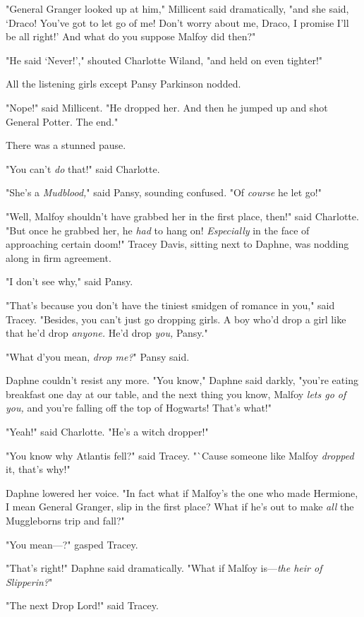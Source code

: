 "General Granger looked up at him," Millicent said dramatically, "and she said,
`Draco! You've got to let go of me! Don't worry about me, Draco, I promise I'll
be all right!' And what do you suppose Malfoy did then?"

"He said `Never!'," shouted Charlotte Wiland, "and held on even tighter!"

All the listening girls except Pansy Parkinson nodded.

"Nope!" said Millicent. "He dropped her. And then he jumped up and shot General
Potter. The end."

There was a stunned pause.

"You can't \emph{do} that!" said Charlotte.

"She's a \emph{Mudblood,}" said Pansy, sounding confused. "Of \emph{course} he
let go!"

"Well, Malfoy shouldn't have grabbed her in the first place, then!" said
Charlotte. "But once he grabbed her, he \emph{had} to hang on!
\emph{Especially} in the face of approaching certain doom!" Tracey Davis,
sitting next to Daphne, was nodding along in firm agreement.

"I don't see why," said Pansy.

"That's because you don't have the tiniest smidgen of romance in you," said
Tracey. "Besides, you can't just go dropping girls. A boy who'd drop a girl
like that{\el} he'd drop \emph{anyone.} He'd drop \emph{you,} Pansy."

"What d'you mean, \emph{drop me?}" Pansy said.

Daphne couldn't resist any more. "You know," Daphne said darkly, "you're eating
breakfast one day at our table, and the next thing you know, Malfoy \emph{lets
go of you,} and you're falling off the top of Hogwarts! That's what!"

"Yeah!" said Charlotte. "He's a witch dropper!"

"You know why Atlantis fell?" said Tracey. "`Cause someone like Malfoy
\emph{dropped} it, that's why!"

Daphne lowered her voice. "In fact{\el} what if Malfoy's the one who made
Hermione, I mean General Granger, slip in the first place? What if he's out to
make \emph{all} the Muggleborns trip and fall?"

"You mean---?" gasped Tracey.

"That's right!" Daphne said dramatically. "What if Malfoy is---\emph{the heir
of Slipperin?}"

"The next Drop Lord!" said Tracey.


